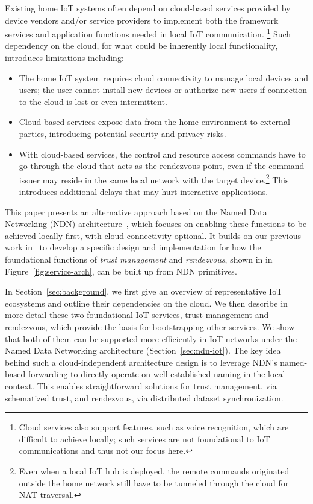 Existing home IoT systems often depend on cloud-based services provided by device vendors and/or service providers to implement both the framework services and application functions needed in local IoT communication.%
\footnote{Cloud services also support features, such as voice recognition, which are difficult to achieve locally; such services are not foundational to IoT communications and thus not our focus here.}
Such dependency on the cloud, for what could be inherently local functionality, introduces limitations including:
\begin{itemize}
\item The home IoT system requires cloud connectivity to manage local devices and users; the user cannot install new devices or authorize new users if connection to the cloud is lost or even intermittent.

\item Cloud-based services expose data from the home environment to external parties, introducing potential security and privacy risks.
 
\item With cloud-based services, 
the control and resource access commands have to go through the cloud that acts as the rendezvous point, even if the command issuer may reside in the same local network with the target device.\footnote{Even when a local IoT hub is deployed, the remote commands originated outside the home network still have to be tunneled through the cloud for NAT traversal.}
This introduces additional delays that may hurt interactive applications.
\end{itemize}

This paper presents an alternative approach based on the Named Data Networking (NDN) architecture~\cite{ccn-van,ndn}, which focuses on enabling these functions to be achieved locally first, with cloud connectivity optional.  It builds on our previous work in~\cite{ndn-iot} to develop a specific design and implementation for how the foundational functions of \emph{trust management} and \emph{rendezvous}, shown in in Figure~\ref{fig:service-arch}, can be built up from NDN primitives. 

In Section~\ref{sec:background}, we first give an overview of representative IoT ecosystems and outline their dependencies on the cloud. 
We then describe in more detail these two foundational IoT services, trust management and rendezvous, which provide the basis for bootstrapping other services.  We show that both of them can be supported more efficiently in IoT networks under the Named Data Networking architecture (Section~\ref{sec:ndn-iot}). 
The key idea behind such a cloud-independent architecture design is to leverage NDN's named-based forwarding to directly operate on well-established naming in the local context.  This enables straightforward solutions for trust management, via schematized trust, and rendezvous, via distributed dataset synchronization.

